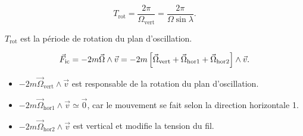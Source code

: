 \documentclass[11pt,a4paper]{article}
\begin{document}
\begin{cadre}\[T_{\mathrm{rot}}=\frac{2\pi}{\Omega_{\mathrm{vert}}}=\frac{2\pi}{\Omega\sin\lambda}.\]\end{cadre}
$T_{\mathrm{rot}}$ est la période de rotation du plan d'oscillation.
\begin{center}\end{center}
\[\vec F_{\mathrm{ic}}=-2m\vec\Omega\wedge\vec v=-2m\left[\vec\Omega_{\mathrm{vert}}+\vec\Omega_{\mathrm{hor1}}+\vec\Omega_{\mathrm{hor2}}\right]\wedge\vec v.\]
\begin{itemize}
\item $-2m\vec\Omega_{\mathrm{vert}}\wedge\vec v$ est responsable de la rotation du plan d'oscillation.
\item $-2m\vec\Omega_{\mathrm{hor1}}\wedge\vec v\simeq\vec0$, car le mouvement se fait selon la direction horizontale 1.
\item $-2m\vec\Omega_{\mathrm{hor2}}\wedge\vec v$ est vertical et modifie la tension du fil.
\end{itemize}
\end{document}
